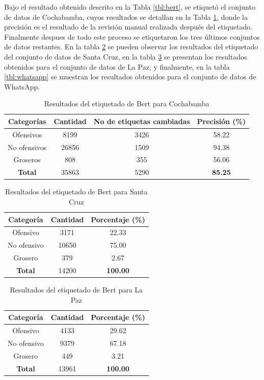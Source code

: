 Bajo el resultado obtenido descrito en la Tabla \ref{tbl:bert}, se etiquetó el conjunto de datos de Cochabamba, cuyos resultados se detallan en la Tabla \ref{tbl:cochabamba}, donde la precisión es el resultado de la revisión manual realizada después del etiquetado. Finalmente despues de todo este proceso se etiquetaron los tres últimos conjuntos de datos restantes. En la tabla \ref{tbl:santacruz} se pueden observar los resultados del etiquetado del conjunto de datos de Santa Cruz, en la tabla \ref{tbl:lapaz} se presentan los resultados obtenidos para el conjunto de datos de La Paz, y finalmente, en la tabla \ref{tbl:whatsapp} se muestran los resultados obtenidos para el conjunto de datos de WhatsApp.


\begin{table}[!ht]
	\centering
	\begin{tabular}{|c|c|c|c|}
		\hline
		\textbf{Categorías} & \textbf{Cantidad} & \textbf{No de etiquetas cambiadas} & \textbf{Precisión (\%)} \\ \hline
		Ofensivos & 8199 & 3426 & 58.22 \\ 
		No ofensivos & 26856 & 1509 & 94.38 \\ 
		Groseros & 808 & 355 & 56.06 \\ \hline
		\textbf{Total} & 35863 & 5290 & \textbf{85.25} \\ \hline
	\end{tabular}
	\caption{Resultados del etiquetado de Bert para Cochabamba}
	\label{tbl:cochabamba}
\end{table}

\begin{table}[!ht]
	\centering
	\begin{tabular}{|c|c|c|}
		\hline
		\textbf{Categoría} & \textbf{Cantidad} & \textbf{Porcentaje (\%)} \\ \hline
		Ofensivo & 3171 & 22.33 \\ 
		No ofensivo & 10650 & 75.00 \\ 
		Grosero & 379 & 2.67 \\ \hline
		\textbf{Total} & 14200 & \textbf{100.00} \\ \hline
	\end{tabular}
	\caption{Resultados del etiquetado de Bert para Santa Cruz}
	\label{tbl:santacruz}
\end{table}


\begin{table}[!ht]
	\centering
	\begin{tabular}{|c|c|c|}
		\hline
		\textbf{Categoría} & \textbf{Cantidad} & \textbf{Porcentaje (\%)} \\ \hline
		Ofensivo & 4133 & 29.62 \\ 
		No ofensivo & 9379 & 67.18 \\ 
		Grosero & 449 & 3.21 \\ \hline
		\textbf{Total} & 13961 & \textbf{100.00} \\ \hline
	\end{tabular}
	\caption{Resultados del etiquetado de Bert para La Paz}
	\label{tbl:lapaz}
\end{table}

